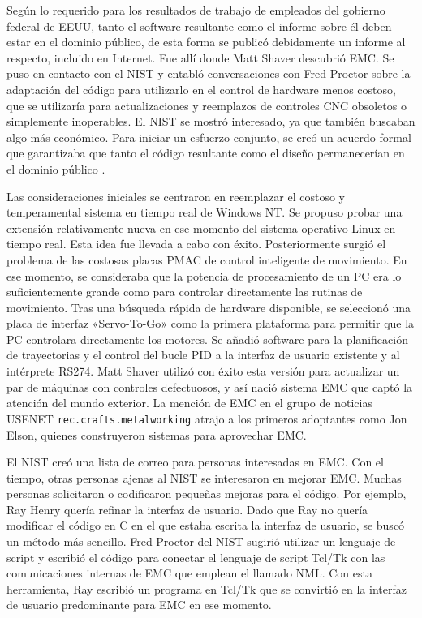\documentclass[english,spanish,a4paper,11pt]{article}
\begin{document}
Según lo requerido para los resultados de trabajo de empleados del gobierno federal de \ac{EEUU}, tanto el software resultante como el informe sobre él deben estar en el dominio público, de esta forma se publicó debidamente un informe al respecto, incluido en Internet. Fue allí donde Matt Shaver descubrió EMC. Se puso en contacto con el \ac{NIST} y entabló conversaciones con Fred Proctor sobre la adaptación del código para utilizarlo en el control de hardware menos costoso, que se utilizaría para actualizaciones y reemplazos de controles CNC obsoletos o simplemente inoperables. El \ac{NIST} se mostró interesado, ya que también buscaban algo más económico. Para iniciar un esfuerzo conjunto, se creó un acuerdo formal que garantizaba que tanto el código resultante como el diseño permanecerían en el dominio público \cite{nist1997speech}.

Las consideraciones iniciales se centraron en reemplazar el costoso y temperamental sistema en tiempo real de Windows NT. Se propuso probar una extensión relativamente nueva en ese momento del sistema operativo Linux en tiempo real. Esta idea fue llevada a cabo con éxito. Posteriormente surgió el problema de las costosas placas \ac{PMAC} de control inteligente de movimiento. En ese momento, se consideraba que la potencia de procesamiento de un PC era lo suficientemente grande como para controlar directamente las rutinas de movimiento. Tras una búsqueda rápida de hardware disponible, se seleccionó una placa de interfaz «Servo-To-Go» como la primera plataforma para permitir que la PC controlara directamente los motores. Se añadió software para la planificación de trayectorias y el control del bucle \ac{PID} a la interfaz de usuario existente y al intérprete RS274. Matt Shaver utilizó con éxito esta versión para actualizar un par de máquinas con controles defectuosos, y así nació sistema \ac{EMC} que captó la atención del mundo exterior. La mención de \ac{EMC} en el grupo de noticias USENET \texttt{rec.crafts.metalworking} atrajo a los primeros adoptantes como Jon Elson, quienes construyeron sistemas para aprovechar \ac{EMC}.

El \ac{NIST} creó una lista de correo para personas interesadas en \ac{EMC}. Con el tiempo, otras personas ajenas al \ac{NIST} se interesaron en mejorar \ac{EMC}. Muchas personas solicitaron o codificaron pequeñas mejoras para el código. Por ejemplo, Ray Henry quería refinar la interfaz de usuario. Dado que Ray no quería  modificar el código en C en el que estaba escrita la interfaz de usuario, se buscó un método más sencillo. Fred Proctor del \ac{NIST} sugirió utilizar un lenguaje de script y escribió el código para conectar el lenguaje de script Tcl/Tk con las comunicaciones internas de \ac{EMC} que emplean el llamado \ac{NML}. Con esta herramienta, Ray escribió un programa en Tcl/Tk que se convirtió en la interfaz de usuario predominante para \ac{EMC} en ese momento. 
\end{document}
